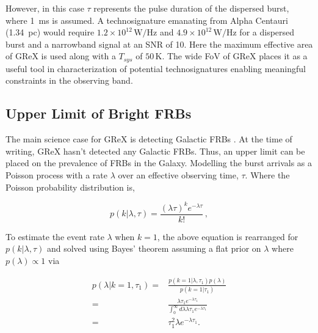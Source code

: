 However, in this case $\tau$ represents the pulse duration of the dispersed burst, where 1~ms is assumed.
A technosignature emanating from Alpha Centauri (1.34~pc) would require $1.2\times10^{12}\,\text{W/Hz}$ and $4.9\times10^{12}\,\text{W/Hz}$ for a dispersed burst and a narrowband signal at an SNR of 10.
Here the maximum effective area of GReX is used along with a $T_{sys}$ of $50\,\text{K}$.
The wide FoV of GReX places it as a useful tool in characterization of potential technosignatures enabling meaningful constraints in the observing band.  

\subsection{Upper Limit of Bright FRBs}

The main science case for GReX is detecting Galactic FRBs \citep{stare2SGR}. At the time of writing, GReX hasn't detected any Galactic FRBs. Thus, an upper limit can be placed on the prevalence of FRBs in the Galaxy. Modelling the burst arrivals as a Poisson process with a rate $\lambda$ over an effective observing time, $\tau$. Where the Poisson probability distribution is, 

\begin{equation}
    p(k|\lambda,\tau) = \frac{(\lambda\tau)^ke^{-\lambda\tau}}{k!}\,,
\end{equation}

To estimate the event rate $\lambda$ when $k=1$, the above equation is rearranged for $p(k|\lambda,\tau)$ and solved using Bayes' theorem assuming a flat prior on $\lambda$ where $p(\lambda)\propto 1$ via


\begin{align}
        p(\lambda|k=1,\tau_1) = & \frac{p(k=1|\lambda,\tau_1)p(\lambda)}{p(k=1|\tau_1)}\\
        =&\frac{\lambda\tau_1e^{-\lambda\tau_1}}{\int_{0}^{\infty}d\lambda \lambda\tau_1e^{-\lambda\tau_1}}\\
        =& \tau_1^2\lambda e^{-\lambda\tau_1}.
    \label{eq:k1_p}
\end{align}

